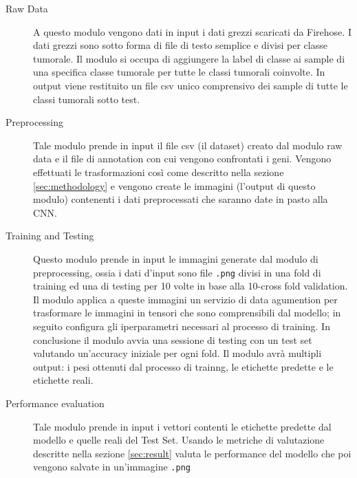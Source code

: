 \begin{description}
    \item[Raw Data] A questo modulo vengono dati in input i dati grezzi scaricati da Firehose. I dati
                    grezzi sono sotto forma di file di testo semplice e divisi per classe tumorale. 
                    Il modulo si occupa di aggiungere la label di classe ai sample di una specifica classe
                    tumorale per tutte le classi tumorali coinvolte. In output viene restituito un file csv
                    unico comprensivo dei sample di tutte le classi tumorali sotto test.
    \item[Preprocessing] Tale modulo prende in input il file csv (il dataset) creato dal modulo raw data e
                         il file di annotation con cui vengono confrontati i geni. Vengono effettuati le 
                         trasformazioni così come descritto nella sezione \ref{sec:methodology} e vengono create
                         le immagini (l'output di questo modulo) contenenti i dati preprocessati che saranno date 
                         in pasto alla CNN.
    \item[Training and Testing] Questo modulo prende in input le immagini generate dal modulo di preprocessing, 
                                ossia i dati d'input sono file \texttt{.png} divisi in una fold di training ed una 
                                di testing per 10 volte in base alla 10-cross fold validation.
                                Il modulo applica a queste immagini un servizio di data agumention per trasformare 
                                le immagini in tensori che sono comprensibili dal modello; in seguito configura 
                                gli iperparametri necessari al processo di training. 
                                In conclusione il modulo avvia una sessione di testing con un test set valutando
                                un'accuracy iniziale per ogni fold.
                                Il modulo avrà multipli output: i pesi ottenuti dal processo di trainng, le etichette
                                predette e le etichette reali.
    \item[Performance evaluation] Tale modulo prende in input i vettori contenti le etichette predette dal modello 
                                  e quelle reali del Test Set.
                                  Usando le metriche di valutazione descritte nella sezione \ref{sec:result} 
                                  valuta le performance del modello che poi vengono salvate in un'immagine \texttt{.png}

\end{description}
